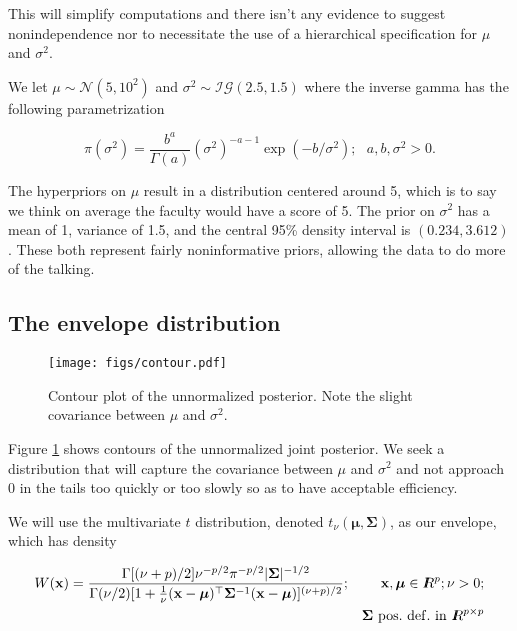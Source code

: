 \documentclass[12pt]{article}
\newcommand{\m}[1]{\mathbf{\bm{#1}}}
\newcommand{\R}{I\hspace{-4.4pt}R}
\begin{document}
\noindent This will simplify computations and there isn't any evidence to suggest nonindependence nor to necessitate the use of a hierarchical specification for $\mu$ and $\sigma^2$.
\bigskip

\noindent We let $\mu\sim\mathcal{N}(5, 10^2)$ and $\sigma^2\sim\mathcal{IG}(2.5, 1.5)$ where the inverse gamma has the following parametrization

\[ \pi(\sigma^2) = \frac{b^a}{\Gamma(a)}(\sigma^2)^{-a-1}\exp(-b/\sigma^2);~~~ a,b,\sigma^2>0. \]

\noindent The hyperpriors on $\mu$ result in a distribution centered around 5, which is to say we think on average the faculty would have a score of 5. The prior on $\sigma^2$ has a mean of 1, variance of 1.5, and the central 95\% density interval is $(0.234, 3.612)$. These both represent fairly noninformative priors, allowing the data to do more of the talking.

\subsection{The envelope distribution}

\begin{figure}
    \begin{center}
    \texttt{[image: figs/contour.pdf]}
    \end{center}
    \caption{Contour plot of the unnormalized posterior. Note the slight covariance between $\mu$ and $\sigma^2$.}
    \label{contour}
\end{figure}


\noindent Figure \ref{contour} shows contours of the unnormalized joint posterior. We seek a distribution that will capture the covariance between $\mu$ and $\sigma^2$ and not approach $0$ in the tails too quickly or too slowly so as to have acceptable efficiency.
\bigskip

\noindent We will use the multivariate $t$ distribution, denoted $t_\nu(\m{\mu}, \m{\Sigma})$, as our envelope, which has density

\begin{eqnarray*}
W(\m{x}) = \frac{\Gamma[(\nu+p)/2]\nu^{-p/2}\pi^{-p/2}|\m{\Sigma}|^{-1/2}}{\Gamma(\nu/2)[1+\frac{1}{\nu}(\m{x}-\m{\mu})^\top\m{\Sigma}^{-1}(\m{x}-\m{\mu})]^{(\nu+p)/2}}; && \m{x}, \m{\mu} \in \R^p; \nu>0; \\
&& \m{\Sigma}~\mathrm{pos.~def.~in~} \R^{p\times p}
\end{eqnarray*}
\end{document}

